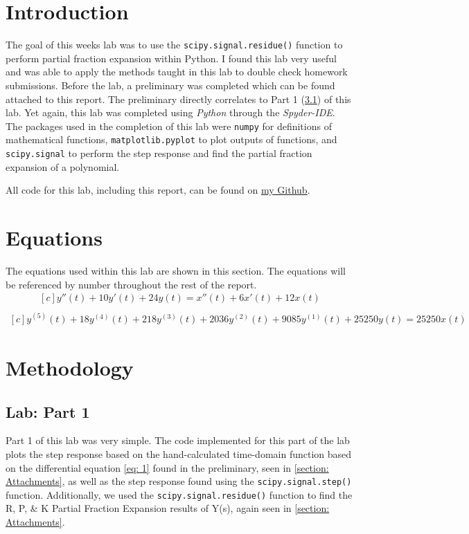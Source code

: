 \documentclass[12pt]{report}
\begin{document}
\section{Introduction}
The goal of this weeks lab was to use the \texttt{scipy.signal.residue()} function to perform partial fraction expansion within Python. I found this lab very useful
and was able to apply the methods taught in this lab to double check homework submissions. Before the lab, a preliminary was completed which can be found attached to
this report. The preliminary directly correlates to Part 1 (\ref{Section: Part1}) of this lab. Yet again, this lab was completed using \textit{Python} through the \textit{Spyder-IDE}. 
The packages used in the completion of this lab were \texttt{numpy} for 
definitions of mathematical functions, \texttt{matplotlib.pyplot} to plot outputs of functions, and \texttt{scipy.signal} to perform the step response and find the 
partial fraction expansion of a polynomial. 

All code for this lab, including this report, can be found on \href{http://github.com/mac-edmondson}{my Github}.
\section{Equations}\label{section: eq}
The equations used within this lab are shown in this section. The equations will be referenced by number throughout the rest of the report.
\begin{equation}\label{eq: 1}
  \begin{aligned}[c]
    y''(t) + 10y'(t) + 24y(t) = x''(t) + 6x'(t) + 12x(t)\\
  \end{aligned}
\end{equation}
\begin{equation}\label{eq: 2}
  \begin{aligned}[c]
    y^{(5)}(t) + 18y^{(4)}(t) + 218y^{(3)}(t) + 2036y^{(2)}(t) + 9085y^{(1)}(t) + 25250y(t) = 25250x(t)
  \end{aligned}
\end{equation}

\section{Methodology}
\subsection{Lab: Part 1}\label{Section: Part1}
Part 1 of this lab was very simple. The code implemented for this part of the lab plots the step response based on the hand-calculated time-domain function
based on the differential equation \eqref{eq: 1} found in
the preliminary, seen in \ref{section: Attachments}, as well as the step response found using the \texttt{scipy.signal.step()} function. Additionally, we used the
\texttt{scipy.signal.residue()} function to find the R, P, \& K Partial Fraction Expansion results of Y(s), again seen in \ref{section: Attachments}.
\end{document}
